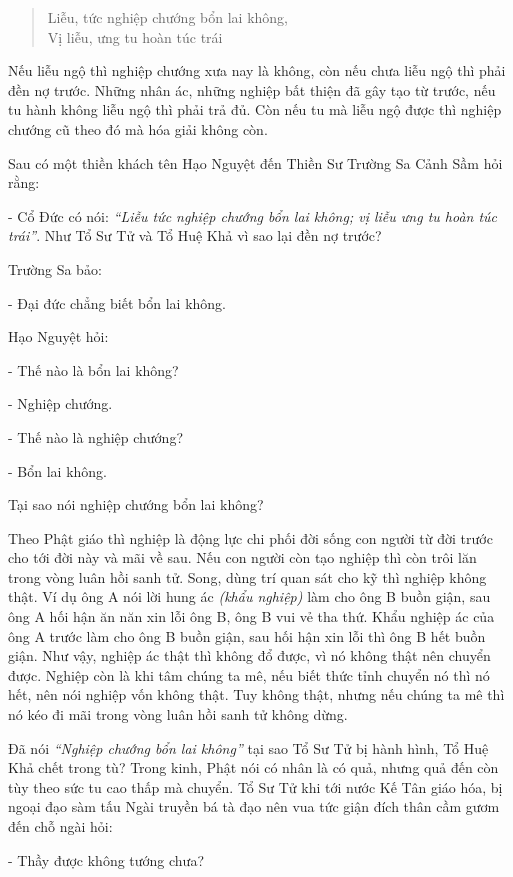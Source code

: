 \documentclass[
  12pt,
  oneside]{book}
\begin{document}
\begin{quote}
Liễu, tức nghiệp chướng bổn lai không,\\
Vị liễu, ưng tu hoàn túc trái
\end{quote}

Nếu liễu ngộ thì nghiệp chướng xưa nay là không, còn nếu chưa liễu ngộ thì phải đền nợ trước. Những nhân ác, những nghiệp bất thiện đã gây tạo từ trước, nếu tu hành không liễu ngộ thì phải trả đủ. Còn nếu tu mà liễu ngộ được thì nghiệp chướng cũ theo đó mà hóa giải không còn.

Sau có một thiền khách tên Hạo Nguyệt đến Thiền Sư Trường Sa Cảnh Sầm hỏi rằng:

- Cổ Đức có nói: \emph{``Liễu tức nghiệp chướng bổn lai không; vị liễu ưng tu hoàn túc trái''}. Như Tổ Sư Tử và Tổ Huệ Khả vì sao lại đền nợ trước?

Trường Sa bảo:

- Đại đức chẳng biết bổn lai không.

Hạo Nguyệt hỏi:

- Thế nào là bổn lai không?

- Nghiệp chướng.

- Thế nào là nghiệp chướng?

- Bổn lai không.

Tại sao nói nghiệp chướng bổn lai không?

Theo Phật giáo thì nghiệp là động lực chi phối đời sống con người từ đời trước cho tới đời này và mãi về sau. Nếu con người còn tạo nghiệp thì còn trôi lăn trong vòng luân hồi sanh tử. Song, dùng trí quan sát cho kỹ thì nghiệp không thật. Ví dụ ông A nói lời hung ác \emph{(khẩu nghiệp)} làm cho ông B buồn giận, sau ông A hối hận ăn năn xin lỗi ông B, ông B vui vẻ tha thứ. Khẩu nghiệp ác của ông A trước làm cho ông B buồn giận, sau hối hận xin lỗi thì ông B hết buồn giận. Như vậy, nghiệp ác thật thì không đổ được, vì nó không thật nên chuyển được. Nghiệp còn là khi tâm chúng ta mê, nếu biết thức tỉnh chuyển nó thì nó hết, nên nói nghiệp vốn không thật. Tuy không thật, nhưng nếu chúng ta mê thì nó kéo đi mãi trong vòng luân hồi sanh tử không dừng.

Đã nói \emph{``Nghiệp chướng bổn lai không''} tại sao Tổ Sư Tử bị hành hình, Tổ Huệ Khả chết trong tù? Trong kinh, Phật nói có nhân là có quả, nhưng quả đến còn tùy theo sức tu cao thấp mà chuyển. Tổ Sư Tử khi tới nước Kế Tân giáo hóa, bị ngoại đạo sàm tấu Ngài truyền bá tà đạo nên vua tức giận đích thân cầm gươm đến chỗ ngài hỏi:

- Thầy được không tướng chưa?
\end{document}
